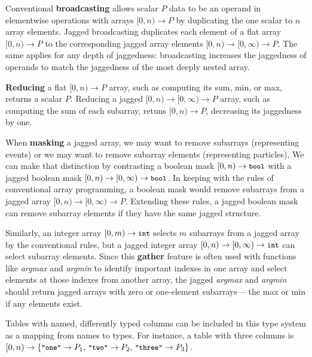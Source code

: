 \documentclass{webofc}
\begin{document}
Conventional {\bf broadcasting} allows scalar $P$ data to be an operand in elementwise operations with arrays $[0, n) \to P$ by duplicating the one scalar to $n$ array elements. Jagged broadcasting duplicates each element of a flat array $[0, n) \to P$ to the corresponding jagged array elements $[0, n) \to [0, \infty) \to P$. The same applies for any depth of jaggedness: broadcasting increases the jaggedness of operands to match the jaggedness of the most deeply nested array.

{\bf Reducing} a flat $[0, n) \to P$ array, such as computing its sum, min, or max, returns a scalar $P$. Reducing a jagged $[0, n) \to [0, \infty) \to P$ array, such as computing the sum of each subarray, retuns $[0, n) \to P$, decreasing its jaggedness by one.

When {\bf masking} a jagged array, we may want to remove subarrays (representing events) or we may want to remove subarray elements (representing particles). We can make that distinction by contrasting a boolean mask $[0, n) \to \mbox{\small\tt bool}$ with a jagged boolean mask $[0, n) \to [0, \infty) \to \mbox{\small\tt bool}$. In keeping with the rules of conventional array programming, a boolean mask would remove subarrays from a jagged array $[0, n) \to [0, \infty) \to P$. Extending these rules, a jagged boolean mask can remove subarray elements if they have the same jagged structure.

Similarly, an integer array $[0, m) \to \mbox{\small\tt int}$ selects $m$ subarrays from a jagged array by the conventional rules, but a jagged integer array $[0, n) \to [0, \infty) \to \mbox{\small\tt int}$ can select subarray elements. Since this {\bf gather} feature is often used with functions like {\it argmax} and {\it argmin} to identify important indexes in one array and select elements at those indexes from another array, the jagged {\it argmax} and {\it argmin} should return jagged arrays with zero or one-element subarrays--- the max or min if any elements exist.

Tables with named, differently typed columns can be included in this type system as a mapping from names to types. For instance, a table with three columns is $[0, n) \to \{\mbox{\small\tt "one"} \to P_1\mbox{, }\mbox{\small\tt "two"} \to P_2\mbox{, }\mbox{\small\tt "three"} \to P_3\}$.

\end{document}
